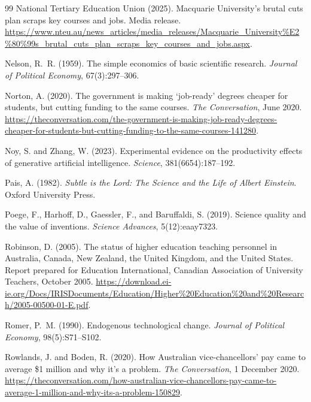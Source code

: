 \documentclass[11pt]{article}
\theoremstyle{definition}
\theoremstyle{remark}
\begin{document}
\begin{thebibliography}{99}
National Tertiary Education Union (2025).
\newblock Macquarie University's brutal cuts plan scraps key courses and jobs.
\newblock Media release. \url{https://www.nteu.au/news_articles/media_releases/Macquarie_University%E2%80%99s_brutal_cuts_plan_scraps_key_courses_and_jobs.aspx}.

Nelson, R.~R. (1959).
\newblock The simple economics of basic scientific research.
\newblock \emph{Journal of Political Economy}, 67(3):297--306.

Norton, A. (2020).
\newblock The government is making `job-ready' degrees cheaper for students, but cutting funding to the same courses.
\newblock \emph{The Conversation}, June 2020. \url{https://theconversation.com/the-government-is-making-job-ready-degrees-cheaper-for-students-but-cutting-funding-to-the-same-courses-141280}.

Noy, S. and Zhang, W. (2023).
\newblock Experimental evidence on the productivity effects of generative artificial intelligence.
\newblock \emph{Science}, 381(6654):187--192.

Pais, A. (1982).
\newblock \emph{Subtle is the Lord: The Science and the Life of Albert Einstein}.
\newblock Oxford University Press.

Poege, F., Harhoff, D., Gaessler, F., and Baruffaldi, S. (2019).
\newblock Science quality and the value of inventions.
\newblock \emph{Science Advances}, 5(12):eaay7323.

Robinson, D. (2005).
\newblock The status of higher education teaching personnel in Australia, Canada, New Zealand, the United Kingdom, and the United States.
\newblock Report prepared for Education International, Canadian Association of University Teachers, October 2005. \url{https://download.ei-ie.org/Docs/IRISDocuments/Education/Higher%20Education%20and%20Research/2005-00500-01-E.pdf}.

Romer, P.~M. (1990).
\newblock Endogenous technological change.
\newblock \emph{Journal of Political Economy}, 98(5):S71--S102.

Rowlands, J. and Boden, R. (2020).
\newblock How Australian vice-chancellors' pay came to average \$1 million and why it's a problem.
\newblock \emph{The Conversation}, 1 December 2020. \url{https://theconversation.com/how-australian-vice-chancellors-pay-came-to-average-1-million-and-why-its-a-problem-150829}.


\end{thebibliography}
\end{document}
